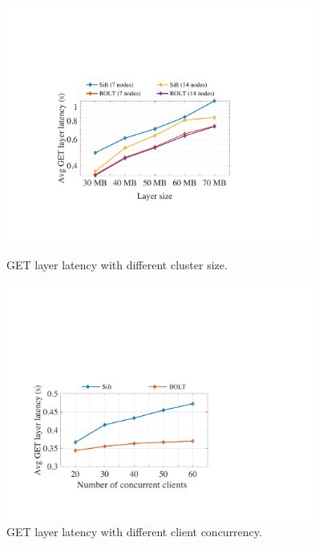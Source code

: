 \begin{figure}[t]
	\centering
	\begin{minipage}{0.3\textwidth}
		\centering
		\includegraphics[width=0.9\textwidth]{graphs/clusterscale.pdf}
		\caption{GET layer latency with different cluster size.}
		\label{fig:eval-clusterscale}
	\end{minipage}%
	\hspace{1mm}
		\begin{minipage}{0.3\textwidth}
		\centering
		\includegraphics[width=0.9\textwidth]{graphs/clientscale.pdf}
		\caption{GET layer latency with different client concurrency.}
		\label{fig:eval-clientscale}
	\end{minipage}%
	\hspace{1mm}
	\begin{minipage}{0.3\textwidth}
	\centering

\end{minipage}
\end{figure}
